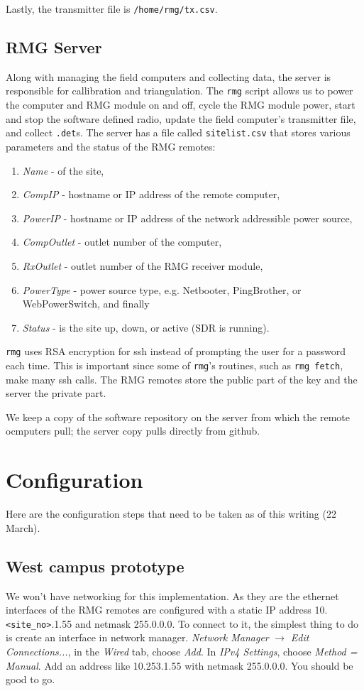 \documentclass[letter]{article}
\begin{document}
Lastly, the transmitter file is \texttt{/home/rmg/tx.csv}. 


\subsection{RMG Server}
Along with managing the field computers and collecting data, the server is responsible for
callibration and triangulation. The \texttt{rmg} script allows us to power the computer and 
RMG module on and off, cycle the RMG module power, start and stop the software defined radio, 
update the field computer's transmitter file, and collect \texttt{.det}s. The server has a 
file called \texttt{sitelist.csv} that stores various parameters and the status of the RMG remotes:
\begin{enumerate}
  \item \textit{Name} - of the site, 
  \item \textit{CompIP} - hostname or IP address of the remote computer, 
  \item \textit{PowerIP} - hostname or IP address of the network addressible power source,
  \item \textit{CompOutlet} - outlet number of the computer, 
  \item \textit{RxOutlet} - outlet number of the RMG receiver module, 
  \item \textit{PowerType} - power source type, e.g. Netbooter, PingBrother, or WebPowerSwitch, and finally
  \item \textit{Status} - is the site up, down, or active (SDR is running). 
\end{enumerate}

\texttt{rmg} uses RSA encryption for ssh instead of prompting the user for a password each time. This is 
important since some of \texttt{rmg}'s routines, such as \texttt{rmg fetch}, make many ssh calls. The 
RMG remotes store the public part of the key and the server the private part. 

We keep a copy of the software repository on the server from which the remote ocmputers pull; the server 
copy pulls directly from github. 

\section{Configuration}
Here are the configuration steps that need to be taken as of this writing (22 March). 

\subsection{West campus prototype}
We won't have networking for this implementation. As they are the ethernet interfaces of the RMG 
remotes are configured with a static IP address 10.\texttt{<site\_no>}.1.55 and netmask 255.0.0.0. 
To connect to it, the simplest thing to do is create an interface 
in network manager. \textit{Network Manager} $\rightarrow$ \textit{Edit Connections...}, in the 
\textit{Wired} tab, choose \textit{Add}. In \textit{IPv4 Settings}, choose \textit{Method = Manual}. 
Add an address like 10.253.1.55 with netmask 255.0.0.0. You should be good to go.  
\end{document}
